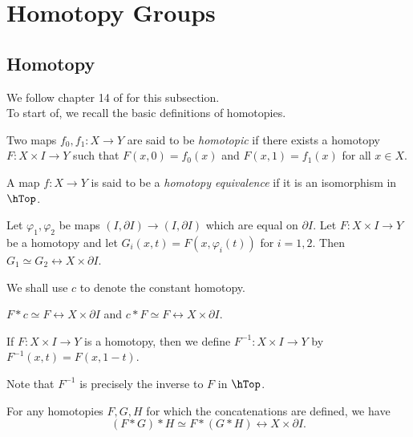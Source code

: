 \section{Homotopy Groups}

\subsection{Homotopy}
We follow chapter 14 of \cite{Bredon} for this subsection.\\

To start of, we recall the basic definitions of homotopies.

\begin{definition}[Homotopy]
    Two maps $f_0, f_1 \colon X \to Y$ are said to
    be \textit{homotopic} if there exists a homotopy
    $F \colon X \times I \to Y$ such that
    $F(x,0) = f_0(x)$ and $F(x,1) = f_1(x)$ for
    all $x \in X$.
\end{definition}

\begin{definition}
    A map $f \colon X \to Y$ is said to be a \textit{homotopy
    equivalence} if it is an isomorphism in
    $\hTop$.
\end{definition}

\begin{lemma}
    Let $\varphi_1, \varphi_2$ be maps
    $\left( I, \partial I \right) \to 
    \left( I, \partial I \right) $ which are equal on
    $\partial I$. Let
    $F \colon X \times I \to Y$ be a homotopy and let
    $G_i (x,t) = F\left( x, \varphi_i(t) \right) $ for
    $i = 1,2$. Then $G_1 \simeq G_2 \rel
    X \times \partial I$.
\end{lemma}

We shall use $c$ to denote the constant homotopy.

\begin{proposition}[]
    $F * c \simeq F \rel X \times \partial I$ and
    $c * F \simeq F \rel X \times \partial I$.
\end{proposition}

\begin{definition}[]
    If $F \colon X \times I \to Y$ is a homotopy, then we
    define $F^{-1} \colon X \times I \to Y$ by
    $F^{-1}\left( x,t \right) = F(x,1-t)$. 
\end{definition}

Note that $F^{-1}$ is precisely the inverse
to $F$ in $\hTop$.

\begin{proposition}[]
    For any homotopies $F,G,H$ for which the
    concatenations 
     are defined, we have
     \[
         \left( F * G  \right) * H
         \simeq F * \left( G * H \right) 
         \rel X \times \partial I.
     \] 
\end{proposition}


